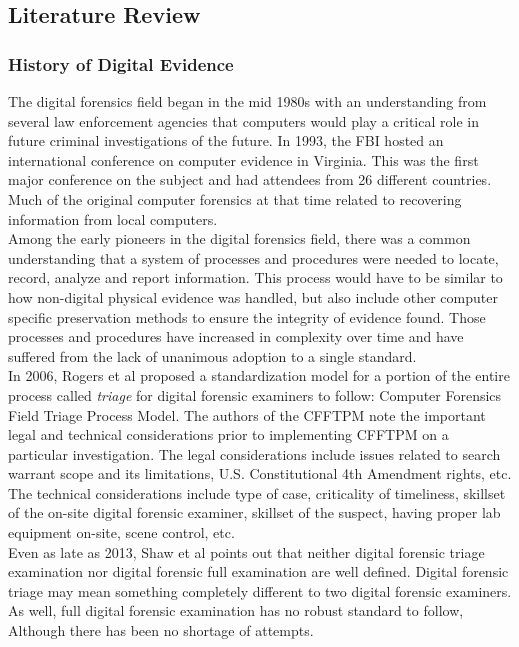 \documentclass[12pt]{article}
\begin{document}
\subsection{Literature Review}
\subsubsection{History of Digital Evidence}

The digital forensics field began in the mid 1980s with an understanding from several law enforcement
agencies that computers would play a critical role in future criminal investigations of the future.
In 1993, the FBI hosted an international conference on computer evidence in Virginia.  This was
the first major conference on the subject and had attendees from 26 different countries.  Much
of the original computer
forensics at that time related to recovering information from local computers.\\

Among the early pioneers in the digital forensics field, there was a common understanding that a
system of processes and procedures were needed to locate, record, analyze and report information.
This process would have to be similar to how non-digital physical evidence was handled, but also
include other computer specific preservation methods to ensure the integrity of evidence found.
Those processes and procedures have increased in complexity over time and have suffered from the
lack of unanimous adoption to a single standard.\\

In 2006, Rogers et al\cite{rogers2006computer} proposed a standardization model for a portion
of the entire process called {\em triage} for digital
forensic examiners to follow: Computer Forensics Field Triage Process Model.
The authors of the CFFTPM note the important legal and technical
considerations prior to implementing CFFTPM on a particular investigation.  The legal
considerations include issues
related to search warrant scope and its limitations, U.S. Constitutional 4th Amendment rights, etc.
The technical 
considerations include type of case, criticality of timeliness, skillset of the on-site
digital forensic examiner, 
skillset of the suspect, having proper lab equipment on-site, scene control, etc.\\

Even as late as 2013, Shaw et al\cite{shaw2013practical} points out that neither digital forensic
triage examination nor digital forensic full examination are well defined.
Digital forensic triage may mean something completely different to two digital forensic
examiners.  As well, full digital forensic examination has no robust standard to follow, Although
there has been no shortage of attempts.\\
\end{document}
